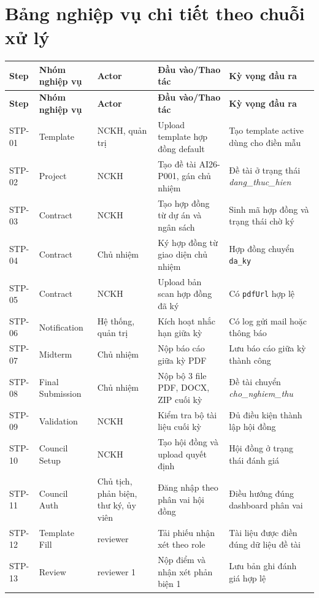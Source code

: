 \documentclass[12pt,a4paper]{report}
\begin{document}
\section{Bảng nghiệp vụ chi tiết theo chuỗi xử lý}
\begin{longtable}{|C{1.0cm}|L{2.6cm}|L{2.6cm}|L{4.2cm}|L{3.0cm}|}
\hline
\textbf{Step} & \textbf{Nhóm nghiệp vụ} & \textbf{Actor} & \textbf{Đầu vào/Thao tác} & \textbf{Kỳ vọng đầu ra} \\ \hline
\endfirsthead
\hline
\textbf{Step} & \textbf{Nhóm nghiệp vụ} & \textbf{Actor} & \textbf{Đầu vào/Thao tác} & \textbf{Kỳ vọng đầu ra} \\ \hline
\endhead
STP-01 & Template & NCKH, quản trị & Upload template hợp đồng default & Tạo template active dùng cho điền mẫu \\ \hline
STP-02 & Project & NCKH & Tạo đề tài AI26-P001, gán chủ nhiệm & Đề tài ở trạng thái \textit{dang\_thuc\_hien} \\ \hline
STP-03 & Contract & NCKH & Tạo hợp đồng từ dự án và ngân sách & Sinh mã hợp đồng và trạng thái chờ ký \\ \hline
STP-04 & Contract & Chủ nhiệm & Ký hợp đồng từ giao diện chủ nhiệm & Hợp đồng chuyển \texttt{da\_ky} \\ \hline
STP-05 & Contract & NCKH & Upload bản scan hợp đồng đã ký & Có \texttt{pdfUrl} hợp lệ \\ \hline
STP-06 & Notification & Hệ thống, quản trị & Kích hoạt nhắc hạn giữa kỳ & Có log gửi mail hoặc thông báo \\ \hline
STP-07 & Midterm & Chủ nhiệm & Nộp báo cáo giữa kỳ PDF & Lưu báo cáo giữa kỳ thành công \\ \hline
STP-08 & Final Submission & Chủ nhiệm & Nộp bộ 3 file PDF, DOCX, ZIP cuối kỳ & Đề tài chuyển \textit{cho\_nghiem\_thu} \\ \hline
STP-09 & Validation & NCKH & Kiểm tra bộ tài liệu cuối kỳ & Đủ điều kiện thành lập hội đồng \\ \hline
STP-10 & Council Setup & NCKH & Tạo hội đồng và upload quyết định & Hội đồng ở trạng thái đánh giá \\ \hline
STP-11 & Council Auth & Chủ tịch, phản biện, thư ký, ủy viên & Đăng nhập theo phân vai hội đồng & Điều hướng đúng dashboard phân vai \\ \hline
STP-12 & Template Fill & reviewer & Tải phiếu nhận xét theo role & Tài liệu được điền đúng dữ liệu đề tài \\ \hline
STP-13 & Review & reviewer 1 & Nộp điểm và nhận xét phản biện 1 & Lưu bản ghi đánh giá hợp lệ \\ \hline

\end{longtable}
\end{document}
